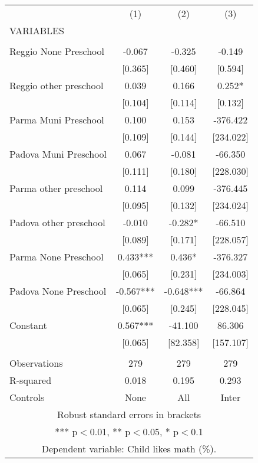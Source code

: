 \begin{tabular}{lccc} \hline
 & (1) & (2) & (3) \\
VARIABLES &  &  &  \\ \hline
 &  &  &  \\
Reggio None Preschool & -0.067 & -0.325 & -0.149 \\
 & [0.365] & [0.460] & [0.594] \\
Reggio other preschool & 0.039 & 0.166 & 0.252* \\
 & [0.104] & [0.114] & [0.132] \\
Parma Muni Preschool & 0.100 & 0.153 & -376.422 \\
 & [0.109] & [0.144] & [234.022] \\
Padova Muni Preschool & 0.067 & -0.081 & -66.350 \\
 & [0.111] & [0.180] & [228.030] \\
Parma other preschool & 0.114 & 0.099 & -376.445 \\
 & [0.095] & [0.132] & [234.024] \\
Padova other preschool & -0.010 & -0.282* & -66.510 \\
 & [0.089] & [0.171] & [228.057] \\
Parma None Preschool & 0.433*** & 0.436* & -376.327 \\
 & [0.065] & [0.231] & [234.003] \\
Padova None Preschool & -0.567*** & -0.648*** & -66.864 \\
 & [0.065] & [0.245] & [228.045] \\
Constant & 0.567*** & -41.100 & 86.306 \\
 & [0.065] & [82.358] & [157.107] \\
 &  &  &  \\
Observations & 279 & 279 & 279 \\
R-squared & 0.018 & 0.195 & 0.293 \\
 Controls & None & All & Inter \\ \hline
\multicolumn{4}{c}{ Robust standard errors in brackets} \\
\multicolumn{4}{c}{ *** p$<$0.01, ** p$<$0.05, * p$<$0.1} \\
\multicolumn{4}{c}{ Dependent variable: Child likes math (\%).} \\
\end{tabular}
